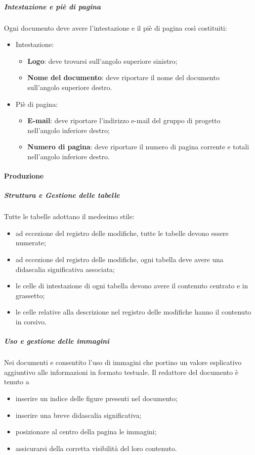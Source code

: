   \subparagraph*{Intestazione e piè di pagina}
	Ogni documento deve avere l'intestazione e il piè di pagina così costituiti:
	\begin{itemize}
		\item Intestazione:
		\begin{itemize}
			\item \textbf{Logo}: deve trovarsi sull'angolo superiore sinistro;
			\item \textbf{Nome del documento}: deve riportare il nome del documento sull'angolo superiore destro.
		\end{itemize}
		\item Piè di pagina:
		\begin{itemize}
			\item \textbf{E-mail}: deve riportare l'indirizzo e-mail del gruppo di progetto
			nell'angolo inferiore destro;
			\item \textbf{Numero di pagina}: deve riportare il numero di pagina corrente e totali
			nell'angolo inferiore destro.
		\end{itemize}
	\end{itemize}

  \paragraph{Produzione}
  \subparagraph*{Struttura e Gestione delle tabelle}
  Tutte le tabelle adottano il medesimo stile:
  \begin{itemize}
  	\item ad eccezione del registro delle modifiche, tutte le tabelle devono essere numerate;
  	\item ad eccezione del registro delle modifiche, ogni tabella deve avere una didascalia significativa associata;
  	\item le celle di intestazione di ogni tabella devono avere il contenuto centrato e in grassetto;
  	\item le celle relative alla descrizione nel registro delle modifiche hanno il contenuto in corsivo.
  \end{itemize}

  \subparagraph*{Uso e gestione delle immagini}
  Nei documenti e consentito l'uso di immagini che portino un valore esplicativo
  aggiuntivo alle informazioni in formato testuale. Il redattore del documento è tenuto a
  \begin{itemize}
  	\item inserire un indice delle figure presenti nel documento;
  	\item inserire una breve didascalia significativa;
  	\item posizionare al centro della pagina le immagini;
  	\item assicurarsi della corretta visibilità del loro contenuto.
  \end{itemize}  


